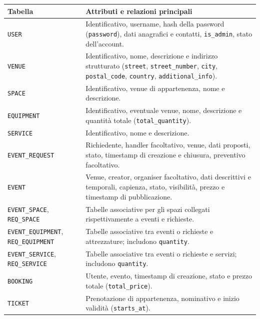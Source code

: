 \begin{table}[!htbp]
    \centering
    \renewcommand{\arraystretch}{1.25}
    \begin{tabular}{|p{}|p{}|}
        \hline
        \textbf{Tabella} & \textbf{Attributi e relazioni principali} \\
        \hline
        \texttt{USER} & Identificativo, username, hash della password (\texttt{password}), dati anagrafici e contatti, \texttt{is\_admin}, stato dell'account. \\
        \hline
        \texttt{VENUE} & Identificativo, nome, descrizione e indirizzo strutturato (\texttt{street}, \texttt{street\_number}, \texttt{city}, \texttt{postal\_code}, \texttt{country}, \texttt{additional\_info}). \\
        \hline
        \texttt{SPACE} & Identificativo, venue di appartenenza, nome e descrizione. \\
        \hline
        \texttt{EQUIPMENT} & Identificativo, eventuale venue, nome, descrizione e quantità totale (\texttt{total\_quantity}). \\
        \hline
        \texttt{SERVICE} & Identificativo, nome e descrizione. \\
        \hline
        \texttt{EVENT\_REQUEST} & Richiedente, handler facoltativo, venue, dati proposti, stato, timestamp di creazione e chiusura, preventivo facoltativo. \\
        \hline
        \texttt{EVENT} & Venue, creator, organiser facoltativo, dati descrittivi e temporali, capienza, stato, visibilità, prezzo e timestamp di pubblicazione. \\
        \hline
        \texttt{EVENT\_SPACE}, \texttt{REQ\_SPACE} & Tabelle associative per gli spazi collegati rispettivamente a eventi e richieste. \\
        \hline
        \texttt{EVENT\_EQUIPMENT}, \texttt{REQ\_EQUIPMENT} & Tabelle associative tra eventi o richieste e attrezzature; includono \texttt{quantity}. \\
        \hline
        \texttt{EVENT\_SERVICE}, \texttt{REQ\_SERVICE} & Tabelle associative tra eventi o richieste e servizi; includono \texttt{quantity}. \\
        \hline
        \texttt{BOOKING} & Utente, evento, timestamp di creazione, stato e prezzo totale (\texttt{total\_price}). \\
        \hline
        \texttt{TICKET} & Prenotazione di appartenenza, nominativo e inizio validità (\texttt{starts\_at}). \\

\end{tabular}
\end{table}
